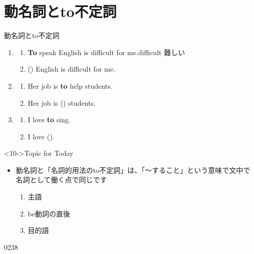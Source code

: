 \documentclass[aspectratio=169,xcolor={dvipsnames,table}]{beamer}
\begin{document}
\section{動名詞とto不定詞}
\begin{frame}[plain,t]{動名詞とto不定詞}

\begin{enumerate}
 \item<1-> \begin{enumerate}
	\item {\bfseries To} speak English is difficult for me.\hfill{\scriptsize difficult  難しい}
	\item () English is difficult for me.%
\hspace{51pt}
       \end{enumerate}
 \item<4->  \begin{enumerate}
	\item Her job is {\bfseries to} help students.
	\item Her job is () students.%
\hfill{}
       \end{enumerate}
 \item<7-> \begin{enumerate}
	\item I love {\bfseries to} sing.
	\item I love ().%
\hspace{146pt}

       \end{enumerate}
\end{enumerate}

\vspace{0pt}

\begin{block}<10->{Topic for Today}
\begin{itemize}[square]\small
 \item  動名詞と「名詞的用法のto不定詞」は、「〜すること」という意味で文中で名詞として働く点で同じです

\begin{enumerate}[circle]
 \item 主語
 \item be動詞の直後
 \item 目的語
\end{enumerate}
\end{itemize}
     \end{block}
\vspace{-10pt}
\hfill{\tiny 0238}\,{\scriptsize {}}


\end{frame}
\end{document}
